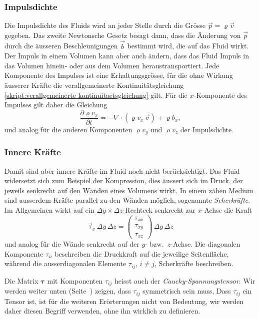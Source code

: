 \subsubsection{Impulsdichte}
Die Impulsdichte des Fluids wird an jeder Stelle durch die Grösse
$\vec{p}=\varrho\vec{v}$ gegeben.
Das zweite Newtonsche Gesetz besagt dann, dass die Änderung von $\vec p$
durch die äusseren Beschleunigungen $\vec{b}$ bestimmt wird,
die auf das Fluid wirkt.
Der Impuls in einem Volumen kann aber auch ändern, dass das Fluid Impuls
in das Volumen hinein- oder aus dem Volumen heraustransportiert.
Jede Komponente des Impulses ist eine Erhaltungsgrösse, für die ohne
Wirkung äusserer Kräfte die verallgemeinerte Kontinuitätsgleichung
\eqref{skript:verallgemeinerte kontinuitaetsgleichung}
gilt.
Für die $x$-Komponente des Impulses gilt daher die Gleichung
\[
\frac{\partial \varrho v_x}{\partial t}
=
-\nabla \cdot(\varrho v_x\,\vec{v})
+\varrho b_x,
\]
und analog für die anderen Komponenten $\varrho v_y$ und $\varrho v_z$ 
der Impulsdichte.

\subsubsection{Innere Kräfte}
Damit sind aber innere Kräfte im Fluid noch nicht berücksichtigt.
Das Fluid widersetzt sich zum Beispiel der Kompression, dies äussert
sich im Druck, der jeweils senkrecht auf den Wänden eines Volumens wirkt.
In einem zähen Medium sind ausserdem Kräfte parallel zu den Wänden
möglich, sogenannte {\em Scherkräfte}.
Im Allgemeinen wirkt auf ein $\Delta y\times\Delta z$-Rechteck senkrecht
zur $x$-Achse die Kraft
\[
\vec{\tau}_x
\,\Delta y\,\Delta z
=
\begin{pmatrix}
\tau_{xx}\\
\tau_{xy}\\
\tau_{xz}
\end{pmatrix}
\,\Delta y\,\Delta z
\]
und analog für die Wände senkrecht auf der $y$- bzw.~$z$-Achse.
Die diagonalen Komponente $\tau_{ii}$ beschreiben die Druckkraft
auf die jeweilige Seitenfläche, während die ausserdiagonalen Elemente
$\tau_{ij}$, $i\ne j$,
Scherkräfte beschreiben.

Die Matrix $\bm{\tau}$ mit Komponenten $\tau_{ij}$ heisst auch der
{\em Cauchy-Spannungstensor}.
Wir werden weiter unten (Seite~\pageref{skript:spannungstensor symmetrisch})
zeigen, dass $\tau_{ij}$ symmetrisch sein muss,
Dass $\tau_{ij}$ ein Tensor ist, ist für die weiteren Erörterungen nicht
von Bedeutung, wir werden daher diesen Begriff verwenden, ohne ihn wirklich
zu definieren.

